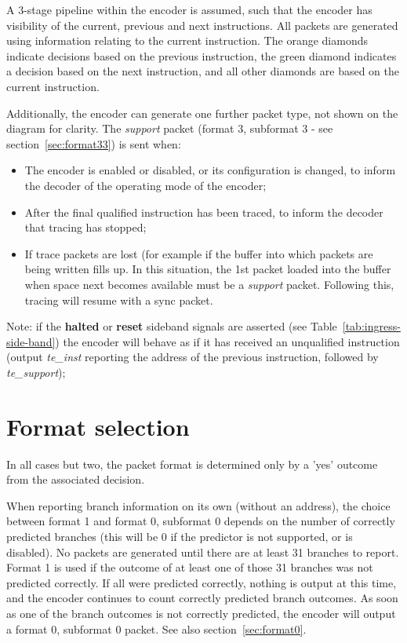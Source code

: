 A 3-stage pipeline within the encoder is assumed, such that the encoder has 
visibility of the current, previous and next instructions.  All packets are generated using 
information relating to the current instruction.  The orange diamonds indicate decisions 
based on the previous instruction, the green diamond indicates a decision based on the
next instruction, and all other diamonds are based on the current instruction.

Additionally, the encoder can generate one further packet type, not shown on the diagram for 
clarity.  The \textit{support} packet (format 3, subformat 3 - see section~\ref{sec:format33}) is 
sent when:

\begin{itemize}
  \item The encoder is enabled or disabled, or its configuration is changed, 
    to inform the decoder of the operating mode of the encoder;
  \item After the final qualified instruction has been traced, to inform the decoder that 
    tracing has stopped;
  \item If trace packets are lost (for example if the buffer into which packets are being 
    written fills up.  In this situation, the 1st packet 
    loaded into the buffer when space next becomes available must be a \textit{support} 
    packet.  Following this, tracing will resume with a sync packet.
\end{itemize}

Note: if the \textbf{halted} or \textbf{reset} sideband signals are asserted (see Table~\ref{tab:ingress-side-band})
the encoder will behave as if it has received an unqualified instruction (output \textit{te\_inst}
reporting the address of the previous instruction, followed by \textit{te\_support});


\section{Format selection} \label{format-selection}

In all cases but two, the packet format is determined only by a 'yes' outcome from the 
associated decision.  

When reporting branch information on its own (without an address), the choice between format 1 and format 0, 
subformat 0 depends on the number of correctly predicted branches (this will be 0 if the predictor is not 
supported, or is disabled).  No packets are generated until there are at least 31 branches to report.  
Format 1 is used if the outcome of at least one of those 31 branches was not predicted correctly.  If all were 
predicted correctly, nothing is output at this time, and the encoder continues to count correctly predicted
branch outcomes.  As soon as one of the branch outcomes is not correctly predicted, the encoder will output
a format 0, subformat 0 packet.  See also section~\ref{sec:format0}.

